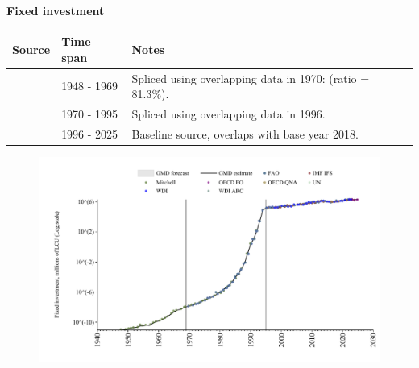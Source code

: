 \documentclass[12pt,a4paper,landscape]{article}
\begin{document}
\begin{adjustbox}{max totalsize={\paperwidth}{\paperheight},center}
\begin{minipage}[t][\textheight][t]{\textwidth}
\vspace*{0.5cm}
{}
\begin{center}
{\Large\bfseries Fixed investment}
\end{center}
\vspace{0.5cm}
\begin{table}[H]
\centering
\small
\begin{tabular}{|l|l|l|}
\hline
\textbf{Source} & \textbf{Time span} & \textbf{Notes} \\
\hline
\rowcolor{white}\cite{Mitchell}& 1948 - 1969 &Spliced using overlapping data in 1970: (ratio = 81.3\%). \\
\rowcolor{lightgray}\cite{WDI}& 1970 - 1995 &Spliced using overlapping data in 1996. \\
\rowcolor{white}\cite{OECD_EO}& 1996 - 2025 &Baseline source, overlaps with base year 2018. \\
\hline
\end{tabular}
\end{table}
\begin{figure}[H]
\centering
\includegraphics[width=\textwidth,height=0.6\textheight,keepaspectratio]{graphs/BRA_finv.pdf}
\end{figure}
\end{minipage}
\end{adjustbox}
\end{document}
